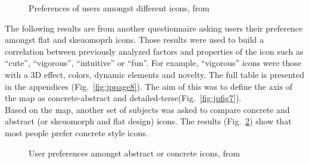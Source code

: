 \documentclass[a4paper,11pt] {article}
\theoremstyle{definition}
\begin{document}
    \begin{figure}[H]
      \caption{Preferences of users amongst different icons, from \cite{jpAnalitics}}
      \label{fig:jpfig6}
    \end{figure}

    The following results are from another questionnaire asking users their preference amongst flat and skeuomoprh icons. Those results were used to build a correlation between previously analyzed factors and properties of the icon such as ``cute'', ``vigorous'', ``intuitive'' or ``fun''. For example, ``vigorous'' icons were those with a 3D effect, colors, dynamic elements and novelty. The full table is presented in the appendices (Fig.~\ref{fig:jppage8}). The aim of this was to define the axis of the map as concrete-abstract and detailed-terse(Fig.~\ref{fig:jpfig7}).\\

    Based on the map, another set of subjects was asked to compare concrete and abstract (or skeuomorph and flat design) icons. The results (Fig.~\ref{fig:jppage10}) show that most people prefer concrete style icons.

    \begin{figure}[H]
      \caption{User preferences amongst abstract or concrete icons, from \cite{jpAnalitics}}
      \label{fig:jppage10}
    \end{figure}
\end{document}

